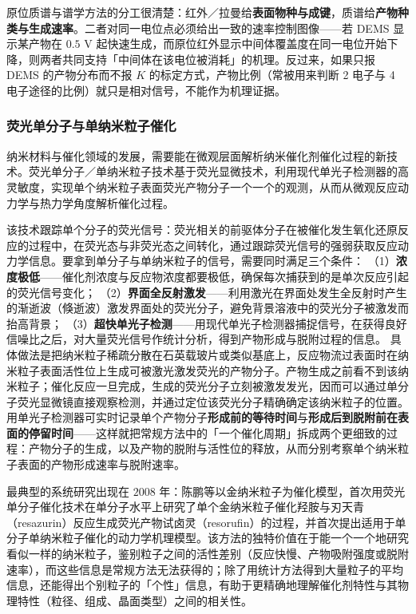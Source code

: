 \begin{crosscheck}
 原位质谱与谱学方法的分工很清楚：红外／拉曼给\textbf{表面物种与成键}，质谱给\textbf{产物种类与生成速率}。二者对同一电位点必须给出一致的速率控制图像——若 DEMS 显示某产物在 $0.5$ V 起快速生成，而原位红外显示中间体覆盖度在同一电位开始下降，则两者共同支持「中间体在该电位被消耗」的机理。反过来，如果只报 DEMS 的产物分布而不报 $K$ 的标定方式，产物比例（常被用来判断 2 电子与 4 电子途径的比例）就只是相对信号，不能作为机理证据。
\end{crosscheck}

\subsubsection{荧光单分子与单纳米粒子催化}

纳米材料与催化领域的发展，需要能在微观层面解析纳米催化剂催化过程的新技术。荧光单分子／单纳米粒子技术基于荧光显微技术，利用现代单光子检测器的高灵敏度，实现单个纳米粒子表面荧光产物分子一个一个的观测，从而从微观反应动力学与热力学角度解析催化过程。

\begin{principle}
 该技术跟踪单个分子的荧光信号：荧光相关的前驱体分子在被催化发生氧化还原反应的过程中，在荧光态与非荧光态之间转化，通过跟踪荧光信号的强弱获取反应动力学信息。要拿到单分子与单纳米粒子的信号，需要同时满足三个条件：
 （1）\textbf{浓度极低}——催化剂浓度与反应物浓度都要极低，确保每次捕获到的是单次反应引起的荧光信号变化；
 （2）\textbf{界面全反射激发}——利用激光在界面处发生全反射时产生的渐逝波（倏逝波）激发界面处的荧光分子，避免背景溶液中的荧光分子被激发而抬高背景；
 （3）\textbf{超快单光子检测}——用现代单光子检测器捕捉信号，在获得良好信噪比之后，对大量荧光信号作统计分析，得到产物形成与脱附过程的信息。
 具体做法是把纳米粒子稀疏分散在石英载玻片或类似基底上，反应物流过表面时在纳米粒子表面活性位上生成可被激光激发荧光的产物分子。产物生成之前看不到该纳米粒子；催化反应一旦完成，生成的荧光分子立刻被激发发光，因而可以通过单分子荧光显微镜直接观察检测，并通过定位该荧光分子精确确定该纳米粒子的位置。用单光子检测器可实时记录单个产物分子\textbf{形成前的等待时间}与\textbf{形成后到脱附前在表面的停留时间}——这样就把常规方法中的「一个催化周期」拆成两个更细致的过程：产物分子的生成，以及产物的脱附与活性位的释放，从而分别考察单个纳米粒子表面的产物形成速率与脱附速率。
\end{principle}

最典型的系统研究出现在 $2008$ 年：陈鹏等以金纳米粒子为催化模型，首次用荧光单分子催化技术在单分子水平上研究了单个金纳米粒子催化羟胺与刃天青（resazurin）反应生成荧光产物试卤灵（resorufin）的过程，并首次提出适用于单分子单纳米粒子催化的动力学机理模型。该方法的独特价值在于能一个一个地研究看似一样的纳米粒子，鉴别粒子之间的活性差别（反应快慢、产物吸附强度或脱附速率），而这些信息是常规方法无法获得的；除了用统计方法得到大量粒子的平均信息，还能得出个别粒子的「个性」信息，有助于更精确地理解催化剂特性与其物理特性（粒径、组成、晶面类型）之间的相关性。

